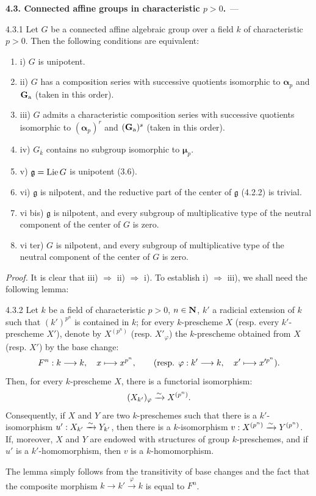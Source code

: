 \par\medskip\noindent\textbf{4.3. Connected affine groups in characteristic $p>0$.}\ ---\par\label{XVII.4.3}
\begin{proposition}{4.3.1}\label{XVII.4.3.1}
Let $G$ be a connected affine algebraic group over a field $k$ of characteristic $p>0$. Then the following conditions are equivalent:
\begin{enumerate}[label={}]
\item i) $G$ is unipotent.
\item ii) $G$ has a composition series with successive quotients isomorphic to $\boldsymbol\alpha_p$ and $\mathbf{G}_{\mathrm{a}}$ (taken in this order).
\item iii) $G$ admits a characteristic composition series with successive quotients isomorphic to $(\boldsymbol\alpha_p)^r$ and $(\mathbf{G}_{\mathrm{a}})^s$ (taken in this order).
\item iv) $G_{\overline k}$ contains no subgroup isomorphic to $\boldsymbol\mu_p$.
\item v) $\mathfrak g=\operatorname{Lie} G$ is unipotent (3.6).
\item vi) $\mathfrak g$ is nilpotent, and the reductive part of the center of $\mathfrak g$ (4.2.2) is trivial.
\item vi bis) $\mathfrak g$ is nilpotent, and every subgroup of multiplicative type of the neutral component of the center of $G$ is zero.
\item vi ter) $G$ is nilpotent, and every subgroup of multiplicative type of the neutral component of the center of $G$ is zero.
\end{enumerate}
\end{proposition}
\noindent\emph{Proof.} It is clear that iii) $\Rightarrow$ ii) $\Rightarrow$ i). To establish i) $\Rightarrow$ iii), we shall need the following lemma:
\begin{lemma}{4.3.2}\label{XVII.4.3.2}
Let $k$ be a field of characteristic $p>0$, $n\in\mathbf{N}$, $k'$ a radicial extension of $k$ such that $(k')^{p^n}$ is contained in $k$; for every $k$-prescheme $X$ (resp. every $k'$-prescheme $X'$), denote by $X^{(p^n)}$ (resp. $X'_\varphi$) the $k$-prescheme obtained from $X$ (resp. $X'$) by the base change:
\[
 F^n:k\longrightarrow k,\quad x\longmapsto x^{p^n},\qquad
 (\text{resp. }\varphi:k'\longrightarrow k,\quad x'\longmapsto x'^{p^n}).
\]
Then, for every $k$-prescheme $X$, there is a functorial isomorphism:
\[
 (X_{k'})_\varphi\xrightarrow{\sim} X^{(p^n)}.
\]
Consequently, if $X$ and $Y$ are two $k$-preschemes such that there is a $k'$-isomorphism $u':X_{k'}\xrightarrow{\sim} Y_{k'}$, then there is a $k$-isomorphism $v:X^{(p^n)}\xrightarrow{\sim} Y^{(p^n)}$. If, moreover, $X$ and $Y$ are endowed with structures of group $k$-preschemes, and if $u'$ is a $k'$-homomorphism, then $v$ is a $k$-homomorphism.
\end{lemma}
The lemma simply follows from the transitivity of base changes and the fact that the composite morphism $k\to k'\xrightarrow{\varphi}k$ is equal to $F^n$.

